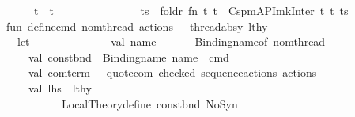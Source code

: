 \begin{isabellebody}
\ \ \ \ \ \ \ \ \ \ \ \ \ \ {\isacharbar}{\kern0pt}\ {\isacharbrackleft}{\kern0pt}t{\isacharbrackright}{\kern0pt}\ {\isacharequal}{\kern0pt}{\isachargreater}{\kern0pt}\ t\isanewline
\ \ \ \ \ \ \ \ \ \ \ \ \ \ {\isacharbar}{\kern0pt}\ ts\ {\isacharequal}{\kern0pt}{\isachargreater}{\kern0pt}\ foldr{}\ {\isacharparenleft}{\kern0pt}fn\ {\isacharparenleft}{\kern0pt}t{}{\isacharcomma}{\kern0pt}\ t{}{\isacharparenright}{\kern0pt}\ {\isacharequal}{\kern0pt}{\isachargreater}{\kern0pt}\ Cspm{\isacharunderscore}{\kern0pt}API{\isachardot}{\kern0pt}mk{\isacharunderscore}{\kern0pt}Inter\ t{}\ t{}{\isacharparenright}{\kern0pt}\ ts{\isacharparenright}{\kern0pt}{\isacharasterisk}{\kern0pt}{\isacharparenright}{\kern0pt}\isanewline
\ \ \ \ \ \ \ \ \ \ {\isacharparenleft}{\kern0pt}{\isacharasterisk}{\kern0pt}fun\ define{\isacharunderscore}{\kern0pt}cmd\ {\isacharparenleft}{\kern0pt}{\isacharbraceleft}{\kern0pt}nom{\isacharunderscore}{\kern0pt}thread{\isacharcomma}{\kern0pt}\ actions{\isacharcomma}{\kern0pt}\ {\isachardot}{\kern0pt}{\isachardot}{\kern0pt}{\isachardot}{\kern0pt}{\isacharbraceright}{\kern0pt}\ {\isacharcolon}{\kern0pt}\ thread{\isacharunderscore}{\kern0pt}absy{\isacharparenright}{\kern0pt}\ lthy\ {\isacharequal}{\kern0pt}\isanewline
\ \ \ \ \ \ \ \ \ \ \ \ let\isanewline
\ \ \ \ \ \ \ \ \ \ \ \ \ \ val\ name\ \ \ \ \ \ {\isacharequal}{\kern0pt}\ Binding{\isachardot}{\kern0pt}name{\isacharunderscore}{\kern0pt}of\ nom{\isacharunderscore}{\kern0pt}thread\isanewline
\ \ \ \ \ \ \ \ \ \ \ \ \ \ val\ const{\isacharunderscore}{\kern0pt}bnd\ {\isacharequal}{\kern0pt}\ Binding{\isachardot}{\kern0pt}name\ {\isacharparenleft}{\kern0pt}name\ {\isacharcircum}{\kern0pt}\ {\isachardoublequote}{\kern0pt}{\isacharunderscore}{\kern0pt}cmd{\isachardoublequote}{\kern0pt}{\isacharparenright}{\kern0pt}\isanewline
\ \ \ \ \ \ \ \ \ \ \ \ \ \ val\ com{\isacharunderscore}{\kern0pt}term\ \ {\isacharequal}{\kern0pt}\ quote{\isacharunderscore}{\kern0pt}com\ checked\ {\isacharparenleft}{\kern0pt}sequence{\isacharunderscore}{\kern0pt}actions\ actions{\isacharparenright}{\kern0pt}\isanewline
\ \ \ \ \ \ \ \ \ \ \ \ \ \ val\ {\isacharparenleft}{\kern0pt}{\isacharparenleft}{\kern0pt}lhs{\isacharcomma}{\kern0pt}\ {\isacharunderscore}{\kern0pt}{\isacharparenright}{\kern0pt}{\isacharcomma}{\kern0pt}\ lthy{\isacharprime}{\kern0pt}{\isacharparenright}{\kern0pt}\ {\isacharequal}{\kern0pt}\isanewline
\ \ \ \ \ \ \ \ \ \ \ \ \ \ \ \ \ \ \ \ Local{\isacharunderscore}{\kern0pt}Theory{\isachardot}{\kern0pt}define\ {\isacharparenleft}{\kern0pt}{\isacharparenleft}{\kern0pt}const{\isacharunderscore}{\kern0pt}bnd{\isacharcomma}{\kern0pt}\ NoSyn{\isacharparenright}{\kern0pt}{\isacharcomma}{\kern0pt}\isanewline

\end{isabellebody}
